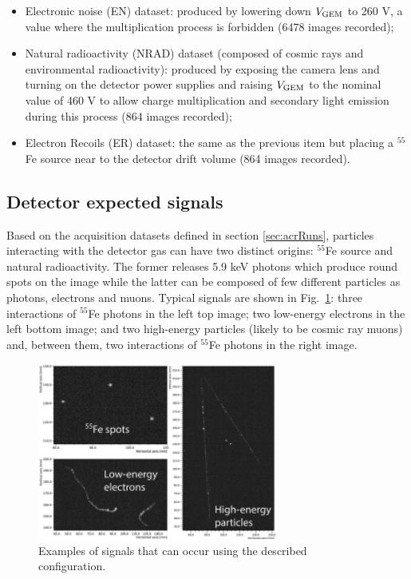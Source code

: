 \documentclass[a4paper,11pt]{article}
\begin{document}
\begin{itemize}
    \item Electronic noise (EN) dataset: produced by lowering down $V\rm _{GEM}$ to 260 V, a value where the multiplication process is forbidden (6478 images recorded);
    \item Natural radioactivity (NRAD) dataset (composed of cosmic rays and environmental radioactivity): produced by exposing the camera lens and turning on the detector power supplies and raising $V\rm _{GEM}$ to the nominal value of 460 V to allow charge multiplication and secondary light emission during this process (864 images recorded);
    \item Electron Recoils (ER) dataset: the same as the previous item but placing a $^{55}$Fe source near to the detector drift volume (864 images recorded).
\end{itemize}

\subsection{Detector expected signals}

Based on the acquisition datasets defined in section \ref{sec:acrRuns}, particles interacting with the detector gas can have two distinct origins: $^{55}$Fe source and natural radioactivity. The former releases 5.9 keV photons which produce round spots on the image while the latter can be composed of few different particles as photons, electrons and muons. 
Typical signals are shown in  Fig.~\ref{fig_example}:
three interactions of $^{55}$Fe photons in the left top image; two low-energy electrons in the left bottom image; and two high-energy particles (likely to be cosmic ray muons) and, between them, two interactions of $^{55}$Fe photons in the right image.

\begin{figure}[!ht]
\centering
\includegraphics[width=0.7\textwidth]{track_examples.pdf}
\caption{Examples of signals that can occur using the described configuration.} \label{fig_example}
\end{figure}
\end{document}
